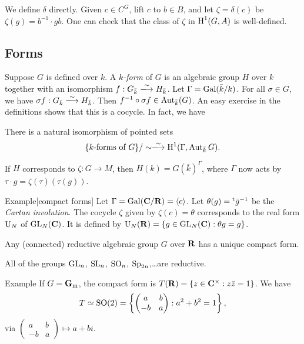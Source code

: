 We define $\delta$ directly. Given $c\in C^G$, lift $c$ to $b\in B$, and let 
$\zeta=\delta(c)$ be $\zeta(g)=b^{-1} \cdot g b$. One can check that the class 
of $\zeta$ in $\operatorname{H}^1(G,A)$ is well-defined. 





\subsection{Forms}

Suppose $G$ is defined over $k$. A \emph{$k$-form} of $G$ is an algebraic group 
$H$ over $k$ together with an isomorphism $f:G_{\bar k} \iso H_{\bar k}$. Let 
$\Gamma=\operatorname{Gal}(\bar k/k)$. For all $\sigma\in G$, we have 
$\sigma f:G_{\bar k}\iso H_{\bar k}$. Then 
$f^{-1}\circ \sigma f\in \operatorname{Aut}_{\bar k}(G)$. An easy exercise in the 
definitions shows that this is a cocycle. In fact, we have 

\begin{theo}
There is a natural isomorphism of pointed sets 
\[
  \{\text{$k$-forms of $G$}\}/\sim \iso \h^1(\Gamma,\automorphism_{\bar k} G) .
\]
\end{theo}

If $H$ corresponds to $\zeta:G\to M$, then $H(k)=G(\bar k)^\Gamma$, where 
$\Gamma$ now acts by $\tau \cdot g = \zeta(\tau)(\tau(g))$. 

\begin{enonce}[remark]{Example}[compact forms]
Let $\Gamma=\operatorname{Gal}(\mathbf{C}/\mathbf{R})=\langle c\rangle$. Let 
$\theta(g) = \prescript{\mathrm{t}}{}{\bar g}^{-1}$ be the \emph{Cartan involution}. The 
cocycle $\zeta$ given by $\zeta(c)=\theta$ corresponds to the real form 
$\operatorname{U}_N$ of $\operatorname{GL}_N(\mathbf{C})$. It is defined by 
$\operatorname{U}_N(\mathbf{R}) = \{g\in \operatorname{GL}_N(\mathbf{C}):\theta g=g\}$. 
\end{enonce}

\begin{theo}
Any (connected) reductive algebraic group $G$ over $\mathbf{R}$ has a unique compact 
form. 
\end{theo}

All of the groups $\operatorname{GL}_n$, $\operatorname{SL}_n$, $\operatorname{SO}_n$, 
$\operatorname{Sp}_{2 n}$,\ldots are reductive. 

\begin{enonce}[remark]{Example}
If $G=\mathbf{G}_{\mathrm{m}}$, the compact form is 
$T(\mathbf{R})=\{z\in \mathbf{C}^\times:z \bar z=1\}$. We have 
\[
  T\simeq \operatorname{SO}(2) = \left\{\begin{pmatrix} a & b \\ -b & a \end{pmatrix} : a^2+b^2=1\right\} ,
\]
via $\begin{pmatrix} a & b\\ -b & a \end{pmatrix} \mapsto a+b i$. 
\end{enonce}

